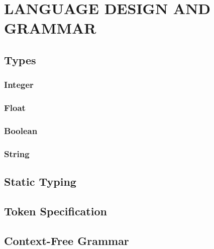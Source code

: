 \chapter{LANGUAGE DESIGN AND GRAMMAR}

\section{Types}

\subsection{Integer}

\subsection{Float}

\subsection{Boolean}

\subsection{String}

\section{Static Typing}

\section{Token Specification}

\section{Context-Free Grammar}

